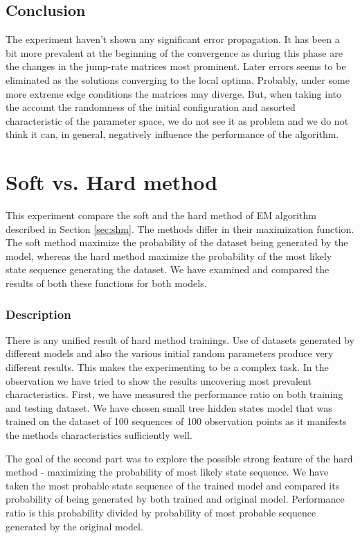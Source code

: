 \documentclass[thesis=M,english]{FITthesis}[2012/10/20]
\begin{document}
\subsection*{ Conclusion }
The experiment haven't shown any significant error propagation. It has been a bit more prevalent at the beginning of the convergence as during this phase are the changes in the jump-rate matrices most prominent. Later errors seems to be eliminated as the solutions converging to the local optima. Probably, under some more extreme edge conditions the matrices may diverge. But, when taking into the account the randomness of the initial configuration and assorted characteristic of the parameter space, we do not see it as problem and we do not think it can, in general, negatively influence the performance of the algorithm. 

\section{Soft vs. Hard method}

This experiment compare the soft and the hard method of EM algorithm described in Section \ref{sec:shm}. The methods differ in their maximization function. The soft method maximize the probability of the dataset being generated by the model, whereas the hard method maximize the probability of the most likely state sequence generating the dataset. We have examined and compared the results of both these functions for both models.   

\subsubsection*{ Description }

There is any unified result of hard method trainings. Use of datasets generated by different models and also the various initial random parameters produce very different results. This makes the experimenting to be a complex task. In the observation we have tried to show the results uncovering most prevalent characteristics. First, we have measured the performance ratio on both training and testing dataset. We have chosen small tree hidden states model that was trained on the dataset of 100 sequences of 100 observation points as it manifests the methods characteristics sufficiently well.    

The goal of the second part was to explore the possible strong feature of the hard method - maximizing the probability of most likely state sequence. We have taken the most probable state sequence of the trained model and compared its probability of being generated by both trained and original model. Performance ratio is this probability divided by probability of most probable sequence generated by the original model.
\end{document}
